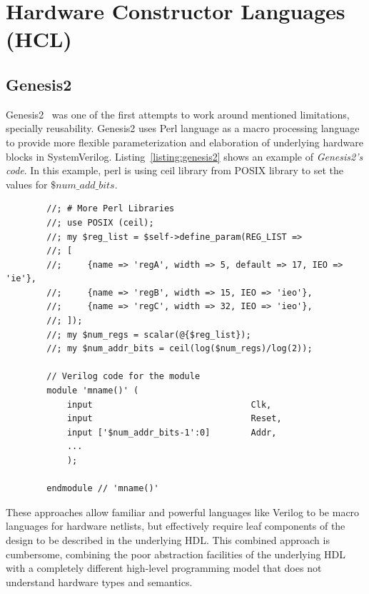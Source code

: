 \section{Hardware Constructor Languages (HCL)}
\subsection{Genesis2}
Genesis2~\cite{genesis2} was one of the first attempts to work around mentioned limitations, specially reusability. Genesis2 uses Perl language as a macro processing language to provide more flexible parameterization and elaboration of underlying hardware blocks in SystemVerilog. Listing~\ref{listing:genesis2} shows an example of \textit{Genesis2's code}.
In this example, perl is using ceil library from POSIX library to set the values for $\$num\_add\_bits$.

\begin{listing}[ht]
    \begin{verbatim}
        //; # More Perl Libraries
        //; use POSIX (ceil);
        //; my $reg_list = $self->define_param(REG_LIST => 
        //; [	
        //;     {name => 'regA', width => 5, default => 17, IEO => 'ie'},
        //;     {name => 'regB', width => 15, IEO => 'ieo'},
        //;     {name => 'regC', width => 32, IEO => 'ieo'},
        //; ]);
        //; my $num_regs = scalar(@{$reg_list});
        //; my $num_addr_bits = ceil(log($num_regs)/log(2));

        // Verilog code for the module
        module 'mname()' (
            input                               Clk,
            input                               Reset,
            input ['$num_addr_bits-1':0]        Addr,
            ...
            );

        endmodule // 'mname()'
    \end{verbatim}
    \caption[Caption for LOF]%
    {Genesis2 code example, combining SystemVerilog and Perl~\cite{genesis2}}
    \label{listing:genesis2}
\end{listing}


These approaches allow familiar and powerful languages like Verilog to be macro languages for hardware netlists, but effectively require leaf components of the design to be described in the underlying HDL.
This combined approach is cumbersome, combining the poor abstraction facilities of the underlying HDL with a completely different high-level programming model that does not understand hardware types and semantics.

